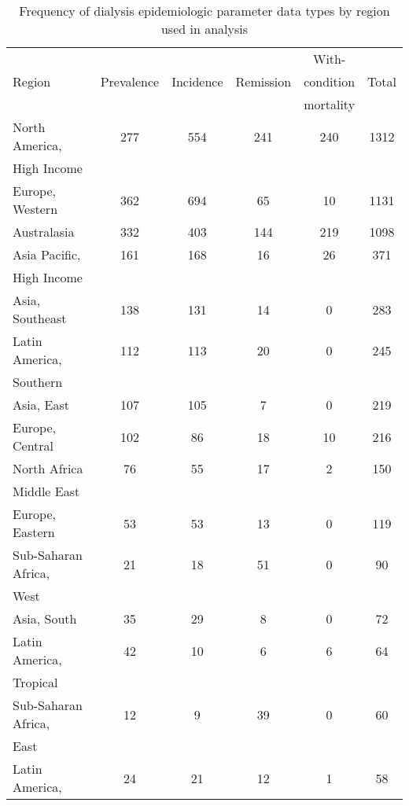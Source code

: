 \begin{table}[h]
    \begin{center}
        \caption{ Frequency of dialysis epidemiologic parameter data types by region used in analysis}
        \label{tab:CKD_data}
        \begin{tabular}{|l|c|c|c|c|c|}
            \hline
                & & & & With- & \\
                Region & Prevalence & Incidence & Remission & condition & Total \\
                & & & & mortality & \\
            \hline
                North America, & 277 & 554 & 241 & 240 & 1312 \\
                High Income & & & & & \\
                Europe, Western & 362 & 694 & 65 & 10 & 1131 \\
                Australasia & 332 & 403 & 144 & 219 & 1098 \\
                Asia Pacific, & 161 & 168 & 16 & 26 & 371 \\
                High Income & & & & & \\
                Asia, Southeast & 138 & 131 & 14 & 0 & 283 \\
                Latin America, & 112 & 113 & 20 & 0 & 245 \\
                Southern & & & & & \\
                Asia, East & 107 & 105 & 7 & 0 & 219 \\
                Europe, Central & 102 & 86 & 18 & 10 & 216 \\
                North Africa & 76 & 55 & 17 & 2 & 150 \\
                Middle East & & & & & \\
                Europe, Eastern & 53 & 53 & 13 & 0 & 119 \\
                Sub-Saharan Africa, & 21 & 18 & 51 & 0 & 90 \\
                West & & & & & \\
                Asia, South  & 35 & 29 & 8 & 0 & 72 \\
                Latin America, & 42 & 10 & 6 & 6 & 64 \\
                Tropical & & & & & \\
                Sub-Saharan Africa, & 12 & 9 & 39 & 0 & 60 \\
                East & & & & & \\
                Latin America, & 24 & 21 & 12 & 1 & 58 \\

\end{tabular}
\end{center}
\end{table}
